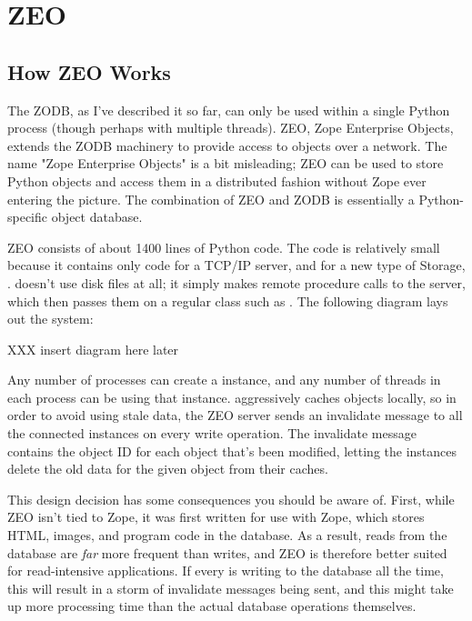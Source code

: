 
   
\section{ZEO}
\label{zeo}

\subsection{How ZEO Works}

The ZODB, as I've described it so far, can only be used within a
single Python process (though perhaps with multiple threads).  ZEO,
Zope Enterprise Objects, extends the ZODB machinery to provide access
to objects over a network.  The name "Zope Enterprise Objects" is a
bit misleading; ZEO can be used to store Python objects and access
them in a distributed fashion without Zope ever entering the picture.
The combination of ZEO and ZODB is essentially a Python-specific
object database.

ZEO consists of about 1400 lines of Python code.  The code is
relatively small because it contains only code for a TCP/IP server,
and for a new type of Storage, .
 doesn't use disk files at all; it simply
makes remote procedure calls to the server, which then passes them on
a regular  class such as .  The
following diagram lays out the system:

XXX insert diagram here later

Any number of processes can create a 
instance, and any number of threads in each process can be using that
instance.   aggressively caches objects
locally, so in order to avoid using stale data, the ZEO server sends
an invalidate message to all the connected 
instances on every write operation.  The invalidate message contains
the object ID for each object that's been modified, letting the
 instances delete the old data for the
given object from their caches.

This design decision has some consequences you should be aware of.
First, while ZEO isn't tied to Zope, it was first written for use with
Zope, which stores HTML, images, and program code in the database.  As
a result, reads from the database are \emph{far} more frequent than
writes, and ZEO is therefore better suited for read-intensive
applications.  If every  is writing to the
database all the time, this will result in a storm of invalidate
messages being sent, and this might take up more processing time than
the actual database operations themselves.

